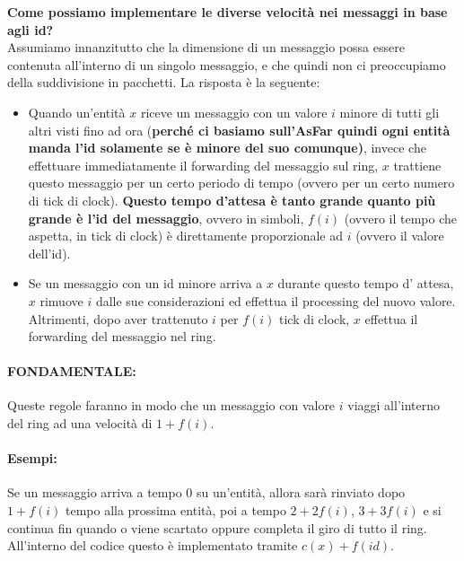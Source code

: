 \textbf{Come possiamo implementare le diverse velocità nei messaggi
    in base agli id?}\\
Assumiamo innanzitutto che la dimensione di un messaggio possa essere contenuta
all'interno di un singolo messaggio, e che quindi non ci preoccupiamo della
suddivisione in pacchetti. La risposta è la seguente:
\begin{itemize}
    \item Quando un'entità $x$ riceve un messaggio con un valore $i$ minore di
          tutti gli altri visti fino ad ora (\textbf{perché ci basiamo
              sull'AsFar quindi ogni entità manda l'id solamente se è minore del suo
              comunque)}, invece che effettuare immediatamente il forwarding del
          messaggio sul ring, $x$ trattiene questo messaggio per un certo
          periodo di tempo (ovvero per un certo numero di tick di clock).
          \textbf{Questo tempo d'attesa è tanto grande quanto più grande è l'id
              del messaggio}, ovvero in simboli, $f(i)$ (ovvero il tempo che
          aspetta, in tick di clock) è direttamente proporzionale ad $i$ (ovvero
          il valore dell'id).
    \item Se un messaggio con un id minore arriva a $x$ durante questo tempo d'
          attesa, $x$ rimuove $i$ dalle sue considerazioni ed effettua il
          processing del nuovo valore. Altrimenti, dopo aver trattenuto $i$ per
          $f(i)$ tick di clock, $x$ effettua il forwarding del messaggio nel ring.
\end{itemize}

\paragraph{FONDAMENTALE:}
\begin{center}
    Queste regole faranno in modo che un messaggio con valore $i$ viaggi
    all'interno del ring ad una velocità di $1+f(i)$.
\end{center}

\paragraph{Esempi:} Se un messaggio arriva a tempo $0$ su un'entità, allora sarà
rinviato dopo $1+f(i)$ tempo alla prossima entità, poi a tempo $2+2f(i)$,
$3+3f(i)$ e si continua fin quando o viene scartato oppure completa il giro di
tutto il ring. All'interno del codice questo è implementato tramite
$c(x)+f(id).$

